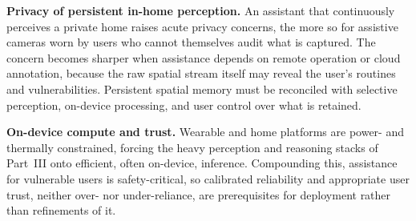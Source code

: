 \textbf{Privacy of persistent in-home perception.} An assistant that continuously perceives a private home raises acute privacy concerns, the more so for assistive cameras worn by users who cannot themselves audit what is captured. 
The concern becomes sharper when assistance depends on remote operation or cloud annotation, because the raw spatial stream itself may reveal the user's routines and vulnerabilities. Persistent spatial memory must be reconciled with selective perception, on-device processing, and user control over what is retained.

\textbf{On-device compute and trust.} Wearable and home platforms are power- and thermally constrained, forcing the heavy perception and reasoning stacks of Part~III onto efficient, often on-device, inference. 
Compounding this, assistance for vulnerable users is safety-critical, so calibrated reliability and appropriate user trust, neither over- nor under-reliance, are prerequisites for deployment rather than refinements of it.
